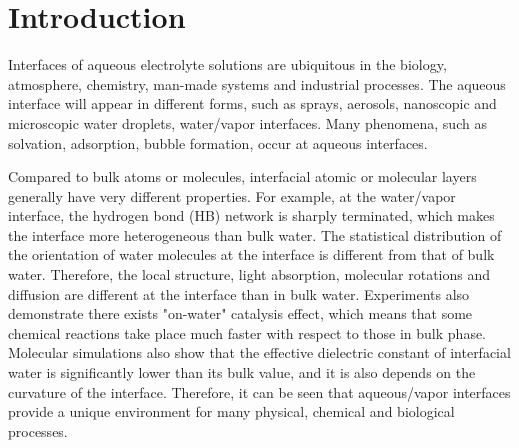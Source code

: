 \chapter{Introduction}\label{CHAPTER_1}
Interfaces of aqueous electrolyte solutions are ubiquitous in the biology, atmosphere, chemistry, man-made systems 
and industrial processes\cite{Irwin88,Tobias99, Benderskii00, 
Asahi01,Benderskii02,Richmond02,LiuH04,
TianCS08,Yamamoto2008, Salmeron2009,ZhangLY09,
LoNostro2012,Piatkowski2014,Balajka2018}.
The aqueous interface will appear in different forms, such as sprays, aerosols, nanoscopic and  microscopic water droplets, water/vapor interfaces.
Many phenomena, such as solvation\cite{Benjamin1996}, adsorption\cite{Chang06}, bubble formation\cite{Craig1993,Craig1993b,Weissenborn1995,Marcelja04,Craig04},
occur at aqueous interfaces\cite{Ball2008,Kuo2004b}. 

Compared to bulk atoms or molecules, interfacial atomic or molecular layers generally have very different properties. 
For example, at the water/vapor interface, the hydrogen bond (HB) network is sharply terminated, which makes the interface more heterogeneous 
than bulk water\cite{singh2013}. 
The statistical distribution of the orientation of water molecules at the interface is different from that of bulk water.
Therefore, the local structure, light absorption,  molecular rotations and diffusion are different at the interface than in bulk water\cite{Jedlovszky2004}.
Experiments also demonstrate there exists "on-water" catalysis effect, which means that some chemical reactions take place much faster 
with respect to those in bulk phase\cite{Rideout1980,Narayan2005,Beattie2010}.
Molecular simulations also show that the effective dielectric constant of interfacial water is significantly lower than its bulk value, 
and it is also depends on the curvature of the interface\cite{Dinpajooh2016}. 
Therefore, it can be seen that aqueous/vapor interfaces provide a unique environment for many physical, chemical and biological processes. 

